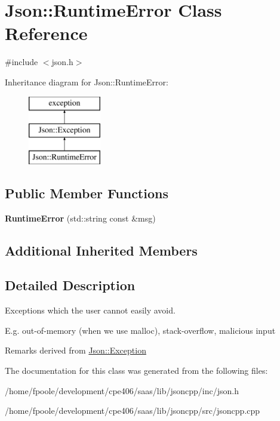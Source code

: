 \hypertarget{class_json_1_1_runtime_error}{}\section{Json\+:\+:Runtime\+Error Class Reference}
\label{class_json_1_1_runtime_error}


{\ttfamily \#include $<$json.\+h$>$}

Inheritance diagram for Json\+:\+:Runtime\+Error\+:\begin{figure}[H]
\begin{center}
\leavevmode
\includegraphics[height=3.000000cm]{class_json_1_1_runtime_error}
\end{center}
\end{figure}
\subsection*{Public Member Functions}
\begin{DoxyCompactItemize}
\item 
\hypertarget{class_json_1_1_runtime_error_ae4f102d5c1efb773887efc8c7911e6f8}{}{\bfseries Runtime\+Error} (std\+::string const \&msg)\label{class_json_1_1_runtime_error_ae4f102d5c1efb773887efc8c7911e6f8}

\end{DoxyCompactItemize}
\subsection*{Additional Inherited Members}


\subsection{Detailed Description}
Exceptions which the user cannot easily avoid.

E.\+g. out-\/of-\/memory (when we use malloc), stack-\/overflow, malicious input

\begin{DoxyRemark}{Remarks}
derived from \hyperlink{class_json_1_1_exception}{Json\+::\+Exception} 
\end{DoxyRemark}


The documentation for this class was generated from the following files\+:\begin{DoxyCompactItemize}
\item 
/home/fpoole/development/cpe406/saas/lib/jsoncpp/inc/json.\+h\item 
/home/fpoole/development/cpe406/saas/lib/jsoncpp/src/jsoncpp.\+cpp\end{DoxyCompactItemize}
